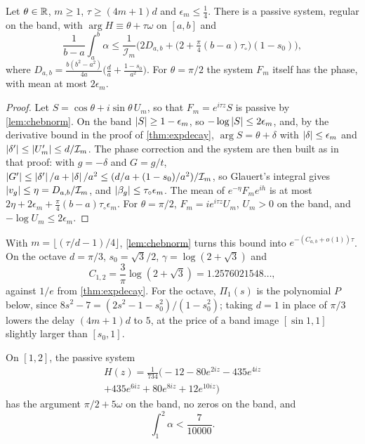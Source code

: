 \begin{theorem}\label{thm:sharperate}
Let $\theta\in\mathbb R$, $m\ge1$, $\tau\ge(4m+1)d$ and $\epsilon_m\le\frac14$. There
is a passive system, regular on the band, with $\arg H\equiv\theta+\tau\omega$ on
$[a,b]$ and
\[
\frac1{b-a}\int_a^b\alpha\le\frac1{\mathcal I_m}\Big(2D_{a,b}+\big(2+\tfrac\pi4(b-a)\tau_\circ\big)(1-s_0)\Big),
\]
where $D_{a,b}=\frac{b(b^2-a^2)}{4a}\big(\frac da+\frac{1-s_0}{a^2}\big)$. For
$\theta=\pi/2$ the system $F_m$ itself has the phase, with mean at most
$2\epsilon_m$.
\end{theorem}

\begin{proof}
Let $S=\cos\theta+i\sin\theta\,U_m$, so that $F_m=e^{i\tau z}S$ is passive by
\cref{lem:chebnorm}. On the band $\left|S\right|\ge1-\epsilon_m$, so
$-\log\left|S\right|\le2\epsilon_m$, and, by the derivative bound in the proof of
\cref{thm:expdecay}, $\arg S=\theta+\delta$ with $\left|\delta\right|\le\epsilon_m$ and
$\left|\delta'\right|\le\left|U_m'\right|\le d/\mathcal I_m$. The phase correction and the
system are then built as in that proof: with $g=-\delta$ and $G=g/t$,
$\left|G'\right|\le\left|\delta'\right|/a+\left|\delta\right|/a^2\le(d/a+(1-s_0)/a^2)/\mathcal I_m$, so
Glauert's integral gives $\left|v_g\right|\le\eta=D_{a,b}/\mathcal I_m$, and
$\left|\beta_g\right|\le\tau_\circ\epsilon_m$. The mean of $e^{-\eta}F_me^{ih}$ is at most
$2\eta+2\epsilon_m+\frac\pi4(b-a)\tau_\circ\epsilon_m$. For $\theta=\pi/2$,
$F_m=ie^{i\tau z}U_m$, $U_m>0$ on the band, and $-\log U_m\le2\epsilon_m$.
\end{proof}

With $m=\lfloor(\tau/d-1)/4\rfloor$, \cref{lem:chebnorm} turns this bound into
$e^{-(C_{a,b}+o(1))\tau}$. On the octave $d=\pi/3$, $s_0=\sqrt3/2$,
$\gamma=\log(2+\sqrt3)$ and
\[
C_{1,2}=\frac3\pi\log(2+\sqrt3)=1.2576021548\ldots,
\]
against $1/e$ from \cref{thm:expdecay}. For the octave, $\Pi_1(s)$ is the
polynomial $P$ below, since $8s^2-7=(2s^2-1-s_0^2)/(1-s_0^2)$; taking $d=1$ in
place of $\pi/3$ lowers the delay $(4m+1)d$ to $5$, at the price of a band
image $[\sin1,1]$ slightly larger than $[s_0,1]$.

\begin{proposition}\label{prop:sixtap}
On $[1,2]$, the passive system
\begin{multline*}
H(z)=\frac1{734}\big(-12-80e^{2iz}-435e^{4iz}\\
+435e^{6iz}+80e^{8iz}+12e^{10iz}\big)
\end{multline*}
has the argument $\pi/2+5\omega$ on the band, no zeros on the band, and
\[
\int_1^2\alpha<\frac7{10000} .
\]
\end{proposition}

